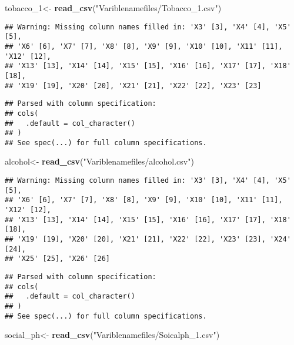 \documentclass[]{article}
\newenvironment{Shaded}{\begin{snugshade}}{\end{snugshade}}
\newcommand{\KeywordTok}[1]{\textcolor[rgb]{0.13,0.29,0.53}{\textbf{#1}}}
\newcommand{\DecValTok}[1]{\textcolor[rgb]{0.00,0.00,0.81}{#1}}
\newcommand{\StringTok}[1]{\textcolor[rgb]{0.31,0.60,0.02}{#1}}
\newcommand{\NormalTok}[1]{#1}
\begin{document}
\begin{Shaded}
\begin{Highlighting}[]
\NormalTok{tobacco_}\DecValTok{1}\NormalTok{<-}\StringTok{ }\KeywordTok{read_csv}\NormalTok{(}\StringTok{"Variblenamefiles/Tobacco_1.csv"}\NormalTok{)}
\end{Highlighting}
\end{Shaded}

\begin{verbatim}
## Warning: Missing column names filled in: 'X3' [3], 'X4' [4], 'X5' [5],
## 'X6' [6], 'X7' [7], 'X8' [8], 'X9' [9], 'X10' [10], 'X11' [11], 'X12' [12],
## 'X13' [13], 'X14' [14], 'X15' [15], 'X16' [16], 'X17' [17], 'X18' [18],
## 'X19' [19], 'X20' [20], 'X21' [21], 'X22' [22], 'X23' [23]
\end{verbatim}

\begin{verbatim}
## Parsed with column specification:
## cols(
##   .default = col_character()
## )
## See spec(...) for full column specifications.
\end{verbatim}

\begin{Shaded}
\begin{Highlighting}[]
\NormalTok{alcohol<-}\StringTok{ }\KeywordTok{read_csv}\NormalTok{(}\StringTok{"Variblenamefiles/alcohol.csv"}\NormalTok{)}
\end{Highlighting}
\end{Shaded}

\begin{verbatim}
## Warning: Missing column names filled in: 'X3' [3], 'X4' [4], 'X5' [5],
## 'X6' [6], 'X7' [7], 'X8' [8], 'X9' [9], 'X10' [10], 'X11' [11], 'X12' [12],
## 'X13' [13], 'X14' [14], 'X15' [15], 'X16' [16], 'X17' [17], 'X18' [18],
## 'X19' [19], 'X20' [20], 'X21' [21], 'X22' [22], 'X23' [23], 'X24' [24],
## 'X25' [25], 'X26' [26]
\end{verbatim}

\begin{verbatim}
## Parsed with column specification:
## cols(
##   .default = col_character()
## )
## See spec(...) for full column specifications.
\end{verbatim}

\begin{Shaded}
\begin{Highlighting}[]
\NormalTok{social_ph<-}\StringTok{ }\KeywordTok{read_csv}\NormalTok{(}\StringTok{"Variblenamefiles/Soicalph_1.csv"}\NormalTok{)}
\end{Highlighting}
\end{Shaded}
\end{document}
